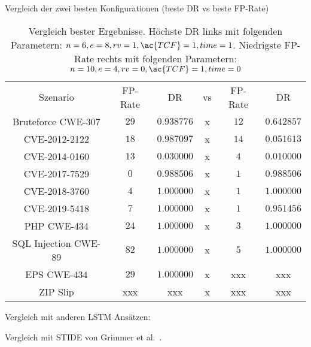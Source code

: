     Vergleich der zwei besten Konfigurationen (beste \ac{DR} vs beste \ac{FP}-Rate)

    \begin{table}[ht]
        \centering
        \begin{tabular}{cccccc}
            \hline
            \rowcolor{GruvGray!36}
            \multicolumn{6}{c}{Vergleich Konfiguration mit höchster \ac{DR} vs niedrigste \ac{FP}-Rate}\\
            \hline
            Szenario & \ac{FP}-Rate & \ac{DR} & vs & \ac{FP}-Rate & \ac{DR}\\
            \toprule
            \rowcolor{GruvGray!16}
            Bruteforce CWE-307   & $29$ & $0.938776$ & x & $12$ & $0.642857$ \\
            CVE-2012-2122 	      & $18$ & $0.987097$ & x & $14$ & $0.051613$ \\
            \rowcolor{GruvGray!16}
            CVE-2014-0160 	      & $13$ & $0.030000$ & x & $4$  & $0.010000$ \\
            CVE-2017-7529 	      & $0$  & $0.988506$ & x & $1$  & $0.988506$ \\
            \rowcolor{GruvGray!16} CVE-2018-3760 	      & $4$  & $1.000000$ & x & $1$  & $1.000000$ \\
            CVE-2019-5418 	      & $7$  & $1.000000$ & x & $1$  & $0.951456$ \\
            \rowcolor{GruvGray!16}
            PHP CWE-434 	      & $24$ & $1.000000$ & x & $3$  & $1.000000$\\
            SQL Injection CWE-89 &	$82$ & $1.000000$ & x & $5$  & $1.000000$\\
            \rowcolor{GruvGray!16}
            EPS CWE-434 	      & $29$ & $1.000000$ & x & xxx  & xxx \\
            ZIP Slip              & xxx  & xxx        & x & xxx  & xxx \\
            \bottomrule
        \end{tabular}
        \caption{Vergleich bester Ergebnisse.
                Höchste \ac{DR} links mit folgenden Parametern: $n=6, e=8, rv=1, \ac{TCF}=1, time=1$.
                Niedrigste \ac{FP}-Rate rechts mit folgenden Parametern: $n=10, e=4, rv=0, \ac{TCF}=1, time=0$}
        \label{tab:LSTM_vs}
    \end{table}

    Vergleich mit anderen LSTM Ansätzen:

    Vergleich mit \ac{STIDE} von Grimmer et al.~\cite{IDSTHREADGRIMMER2021}.


